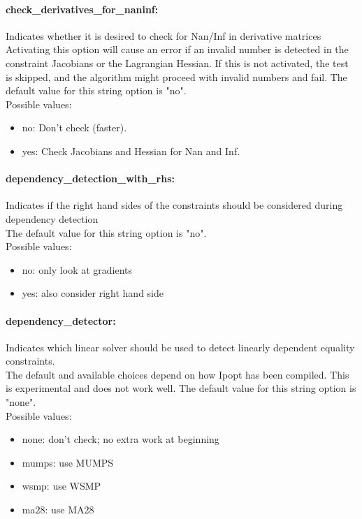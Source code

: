 \paragraph{check\_derivatives\_for\_naninf:}\label{sec:check_derivatives_for_naninf} Indicates whether it is desired to check for Nan/Inf in derivative matrices $\;$ \\
 Activating this option will cause an error if an
invalid number is detected in the constraint
Jacobians or the Lagrangian Hessian.  If this is
not activated, the test is skipped, and the
algorithm might proceed with invalid numbers and
fail.
The default value for this string option is "no".
\\ 
Possible values:
\begin{itemize}
   \item no: Don't check (faster).
   \item yes: Check Jacobians and Hessian for Nan and Inf.
\end{itemize}

\paragraph{dependency\_detection\_with\_rhs:}\label{sec:dependency_detection_with_rhs} Indicates if the right hand sides of the constraints should be considered during dependency detection $\;$ \\

The default value for this string option is "no".
\\ 
Possible values:
\begin{itemize}
   \item no: only look at gradients
   \item yes: also consider right hand side
\end{itemize}

\paragraph{dependency\_detector:}\label{sec:dependency_detector} Indicates which linear solver should be used to detect linearly dependent equality constraints. $\;$ \\
 The default and available choices depend on how
Ipopt has been compiled.  This is experimental
and does not work well.
The default value for this string option is "none".
\\ 
Possible values:
\begin{itemize}
   \item none: don't check; no extra work at beginning
   \item mumps: use MUMPS
   \item wsmp: use WSMP
   \item ma28: use MA28
\end{itemize}

